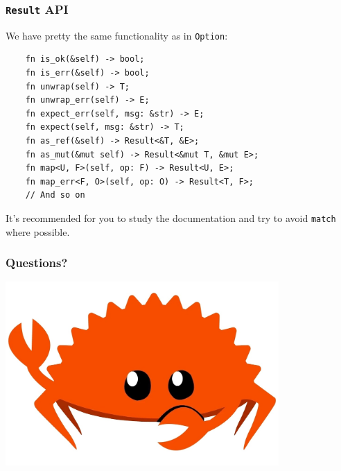 \documentclass[aspectratio=1610,t]{beamer}
\begin{document}

\begin{frame}[fragile]
\frametitle{\texttt{Result} API}
We have pretty the same functionality as in \texttt{Option}:

\begin{verbatim}
    fn is_ok(&self) -> bool;
    fn is_err(&self) -> bool;
    fn unwrap(self) -> T;
    fn unwrap_err(self) -> E;
    fn expect_err(self, msg: &str) -> E;
    fn expect(self, msg: &str) -> T;
    fn as_ref(&self) -> Result<&T, &E>;
    fn as_mut(&mut self) -> Result<&mut T, &mut E>;
    fn map<U, F>(self, op: F) -> Result<U, E>;
    fn map_err<F, O>(self, op: O) -> Result<T, F>;
    // And so on
\end{verbatim}

It's recommended for you to study the documentation and try to avoid \texttt{match} where possible.
\end{frame}


\begin{frame}
\frametitle{Questions?}
\begin{center}
\includegraphics[width=\textwidth,height=7cm,keepaspectratio]{images/crab.jpg}
\end{center}
\end{frame}

\end{document}
